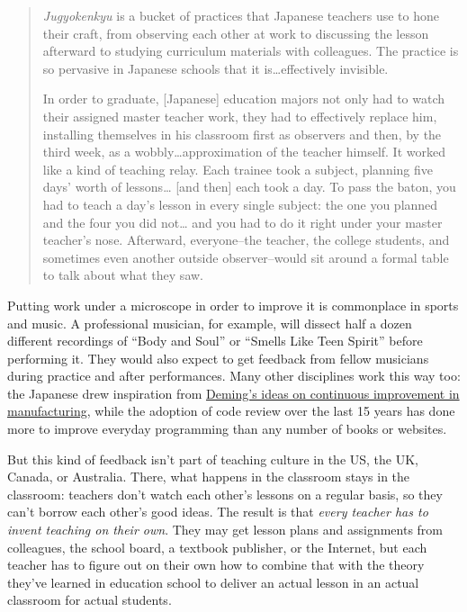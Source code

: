 \documentclass[10pt,statementpaper]{memoir}
\begin{document}
\begin{quote}
\emph{Jugyokenkyu} is a bucket of practices that Japanese teachers use
to hone their craft, from observing each other at work to discussing the
lesson afterward to studying curriculum materials with colleagues. The
practice is so pervasive in Japanese schools that it
is\ldots{}effectively invisible.

In order to graduate, {[}Japanese{]} education majors not only had to
watch their assigned master teacher work, they had to effectively
replace him, installing themselves in his classroom first as observers
and then, by the third week, as a wobbly\ldots{}approximation of the
teacher himself. It worked like a kind of teaching relay. Each trainee
took a subject, planning five days' worth of lessons\ldots{} {[}and
then{]} each took a day. To pass the baton, you had to teach a day's
lesson in every single subject: the one you planned and the four you did
not\ldots{} and you had to do it right under your master teacher's nose.
Afterward, everyone--the teacher, the college students, and sometimes
even another outside observer--would sit around a formal table to talk
about what they saw.
\end{quote}

Putting work under a microscope in order to improve it is commonplace in
sports and music. A professional musician, for example, will dissect
half a dozen different recordings of ``Body and Soul'' or ``Smells Like
Teen Spirit'' before performing it. They would also expect to get
feedback from fellow musicians during practice and after performances.
Many other disciplines work this way too: the Japanese drew inspiration
from \href{https://en.wikipedia.org/wiki/W._Edwards_Deming}{Deming's
ideas on continuous improvement in manufacturing}, while the adoption of
code review over the last 15 years has done more to improve everyday
programming than any number of books or websites.

But this kind of feedback isn't part of teaching culture in the US, the
UK, Canada, or Australia. There, what happens in the classroom stays in
the classroom: teachers don't watch each other's lessons on a regular
basis, so they can't borrow each other's good ideas. The result is that
\emph{every teacher has to invent teaching on their own}. They may get
lesson plans and assignments from colleagues, the school board, a
textbook publisher, or the Internet, but each teacher has to figure out
on their own how to combine that with the theory they've learned in
education school to deliver an actual lesson in an actual classroom for
actual students.
\end{document}
